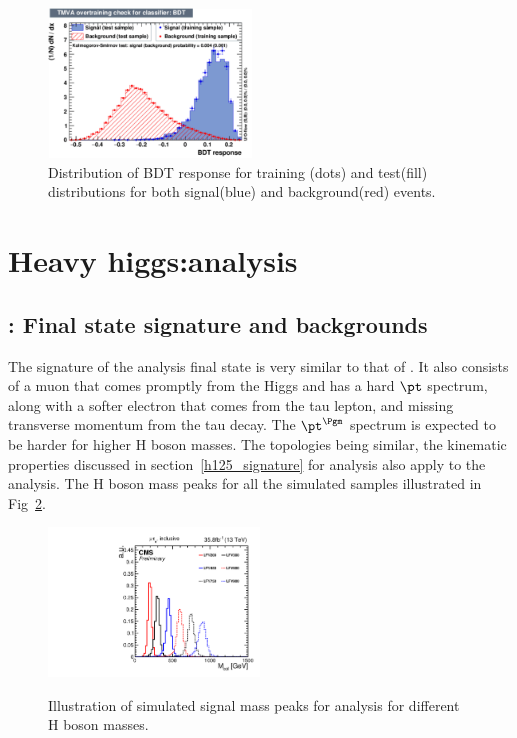 \begin{figure}[htpb]
\begin{center}
\includegraphics[width=0.48\textwidth]{plots_and_figures/chapter5/overtrain_BDT.pdf}
\end{center}
\caption{Distribution of BDT response for training (dots) and test(fill) distributions for both signal(blue) and background(red) events.}
\label{fig:BDT_response}
\end{figure}

\section{ Heavy higgs:\Hmue analysis}
\subsection{\Hmue: Final state signature and backgrounds}
\label{HH_evt_sel}

The signature of the \Hmue analysis final state is very similar to that of \hmue. It also consists of a muon that comes promptly from the Higgs and has a hard $\pt$ spectrum, along with a softer electron that comes from the tau lepton, and missing transverse momentum from the tau decay. The $\pt^{\Pgm}$ spectrum is expected to be harder for higher H boson masses. The topologies being similar, the kinematic properties discussed in section~\ref{h125_signature} for \hmue analysis also apply to the \Hmue analysis. The H boson mass peaks for all the simulated samples illustrated in Fig~\ref{fig:sig_peaks}.


\begin{figure}[htbp]
     \centering
     \includegraphics[width=0.5\textwidth]{plots_and_figures/chapter5/HM_signals_only_colmass.pdf}\\
     \caption{Illustration of simulated signal mass peaks for \Hmue analysis for different H boson masses.}
     \label{fig:sig_peaks}
\end{figure}

